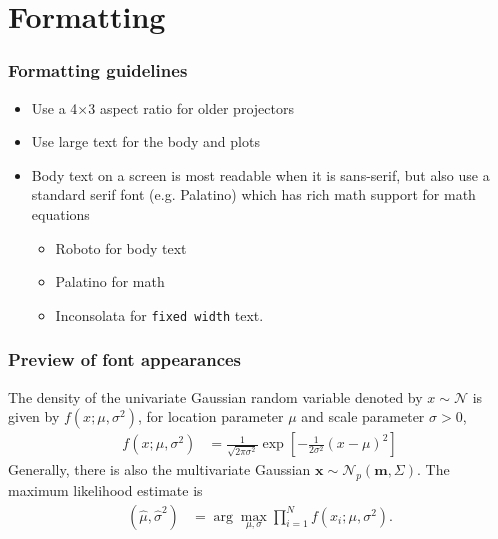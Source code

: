 \section{Formatting}


\begin{frame}
  \frametitle{Formatting guidelines}
    \begin{itemize}
    \item Use a 4$\times$3 aspect ratio for older projectors
    \item Use \large{large} \normalsize text for the body and plots
  \item Body text on a screen is most readable when it is sans-serif,
    but also use a standard serif font (e.g. Palatino) which has rich
    math support for math equations
    \begin{itemize}
    \item Roboto for body text
    \item Palatino for math
    \item Inconsolata for \texttt{fixed width} text.
    \end{itemize}
  \end{itemize}
\end{frame}


\begin{frame}
  \frametitle{Preview of font appearances}

  The density of the univariate Gaussian random variable denoted by
  $x \sim \mathcal{N}$ is given by $f(x; \mu, \sigma^2)$, for location
  parameter $\mu$ and scale parameter $\sigma > 0$,
%
  \begin{align*}
    f(x; \mu, \sigma^2) &= \frac{1}{\sqrt{2\pi\sigma^2}} \exp 
           \left[
           -\frac{1}{2\sigma^2}(x - \mu)^2
           \right]
  \end{align*}
%
  Generally, there is also the multivariate Gaussian
  $\mathbf{x} \sim \mathcal{N}_p(\mathbf{m}, \Sigma)$. The maximum
  likelihood estimate is
  \begin{align*}
    (\hat{\mu}, \hat{\sigma}^2) &= \arg \max_{\mu, \sigma} \prod_{i=1}^N f(x_i; \mu, \sigma^2).
  \end{align*}
  
\end{frame}



